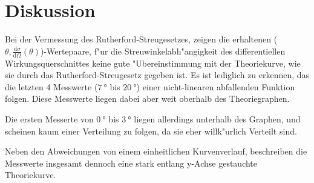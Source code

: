 \section{Diskussion}
\label{sec:Diskussion}
  Bei der Vermessung des Rutherford-Streugesetzes, zeigen die erhaltenen ($\theta,\frac{\text{d}\sigma}{\text{d}\Omega}(\theta)$)-Wertepaare, f"ur die Streuwinkelabh"angigkeit des differentiellen Wirkungsquerschnittes keine gute "Ubereinstimmung mit der Theoriekurve, wie sie durch das Rutherford-Streugesetz gegeben ist.
  Es ist lediglich zu erkennen, das die letzten 4 Messwerte ($\SI{7}{\degree}$ bis $\SI{20}{\degree}$) einer nicht-linearen abfallenden Funktion folgen.
  Diese Messwerte liegen dabei aber weit oberhalb des Theoriegraphen.

  Die ersten Messerte von $\SI{0}{\degree}$ bis $\SI{3}{\degree}$ liegen allerdings unterhalb des Graphen, und scheinen kaum einer Verteilung zu folgen, da sie eher willk"urlich Verteilt sind.

  Neben den Abweichungen von einem einheitlichen Kurvenverlauf, beschreiben die Messwerte insgesamt dennoch eine stark entlang y-Achse gestauchte Theoriekurve.
